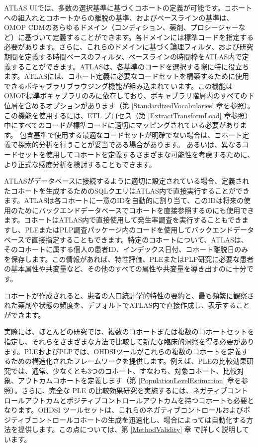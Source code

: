 \documentclass[
  11pt]{book}
\theoremstyle{definition}
\theoremstyle{definition}
\theoremstyle{definition}
\theoremstyle{definition}
\theoremstyle{remark}
\begin{document}
ATLAS UIでは、多数の選択基準に基づくコホートの定義が可能です。コホートへの組入れとコホートからの離脱の基準、およびベースラインの基準は、OMOP CDMのあらゆるドメイン（コンディション、薬剤、プロシージャーなど）に基づいて定義することができます。各ドメインには標準コードを指定する必要があります。さらに、これらのドメインに基づく論理フィルタ、および研究期間を定義する時間ベースのフィルタ、ベースラインの時間枠をATLAS内で定義することができます。ATLASは、各基準のコードを選択する際に特に役立ちます。ATLASには、コホート定義に必要なコードセットを構築するために使用できるボキャブラリブラウジング機能が組み込まれています。この機能はOMOP標準ボキャブラリのみに依存しており、ボキャブラリ階層内のすべての下位層を含めるオプションがあります（第 \ref{StandardizedVocabularies} 章を参照）。この機能を使用するには、ETL プロセス（第 \ref{ExtractTransformLoad} 章参照）中にすべてのコードが標準コードに適切にマッピングされている必要があります。 包含基準で使用する最適なコードセットが明確でない場合は、コホート定義で探索的分析を行うことが妥当である場合があります。 あるいは、異なるコードセットを使用してコホートを定義するさまざまな可能性を考慮するために、より正式な感度分析を検討することもできます。

ATLASがデータベースに接続するように適切に設定されている場合、定義されたコホートを生成するためのSQLクエリはATLAS内で直接実行することができます。ATLASは各コホートに一意のIDを自動的に割り当て、このIDは将来の使用のためにバックエンドデータベースでコホートを直接参照するのにも使用できます。コホートはATLAS内で直接使用して発生率調査を実行することもできますし、PLEまたはPLP調査パッケージ内のコードを使用してバックエンドデータベースで直接指定することもできます。特定のコホートについて、ATLASは、そのコホートに属する個人の患者ID、インデックス日付、コホート離脱日のみを保存します。この情報があれば、特性評価、PLEまたはPLP研究に必要な患者の基本属性や共変量など、その他のすべての属性や共変量を導き出すのに十分です。

コホートが作成されると、患者の人口統計学的特性の要約と、最も頻繁に観察された薬剤や状態の頻度を、デフォルトでATLAS内で直接作成し、表示することができます。

実際には、ほとんどの研究では、複数のコホートまたは複数のコホートセットを指定し、それらをさまざまな方法で比較して新たな臨床的洞察を得る必要があります。PLEおよびPLPでは、OHDSIツールがこれらの複数のコホートを定義するための構造化されたフレームワークを提供します。例えば、PLEの比較効果研究では、通常、少なくとも3つのコホート、すなわち、対象コホート、比較対象、アウトカムコホートを定義します（第 \ref{PopulationLevelEstimation} 章を参照）。さらに、完全な PLE の比較効果研究を実施するには、ネガティブコントロールアウトカムとポジティブコントロールアウトカムを持つコホートも必要となります。OHDSI ツールセットは、これらのネガティブコントロールおよびポジティブコントロールコホートの生成を迅速化し、場合によっては自動化する方法を提供します。この点については、第 \ref{MethodValidity} 章 で詳しく説明しています。
\end{document}
